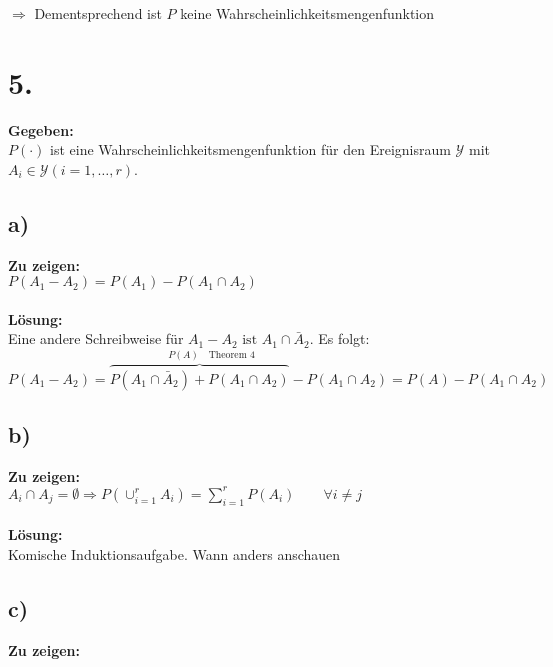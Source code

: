 \documentclass{article}
\begin{document}
$\Longrightarrow$ Dementsprechend ist $P$ keine Wahrscheinlichkeitsmengenfunktion

\section*{5.}

\textbf{Gegeben:} \\

$P(\cdot)$ ist eine Wahrscheinlichkeitsmengenfunktion für den Ereignisraum $\mathcal{Y}$ mit $A_{i} \in \mathcal{Y} (i = 1, \ldots , r)$. 
\subsection*{a)}
\textbf{Zu zeigen:}\\ 

$P(A_{1} - A_{2}) = P(A_{1}) - P(A_{1} \cap A_{2})$\\ \\
\textbf{Lösung:}\\

Eine andere Schreibweise für $A_{1} - A_{2} \text{ ist } A_{1} \cap \bar{A}_{2}$. Es folgt:  \[P(A_{1} - A_{2}) = \overbrace{P(A_{1} \cap \bar{A}_{2}) + P(A_{1}\cap A_{2})}^{\qquad ~ ~P(A)\quad \text{Theorem 4}} - P(A_{1}\cap A_{2}) = P(A)- P(A_{1}\cap A_{2})\]
\subsection*{b)}
\textbf{Zu zeigen: }\\

$A_{i} \cap A_{j} = \emptyset \Rightarrow P(\cup_{i=1}^{r} A_{i}) = \sum_{i = 1}^{r} P(A_{i}) \qquad \forall i\neq j$ \\ \\
\textbf{Lösung:} \\

Komische Induktionsaufgabe. Wann anders anschauen
\subsection*{c)}
\textbf{Zu zeigen: }\\
\end{document}
